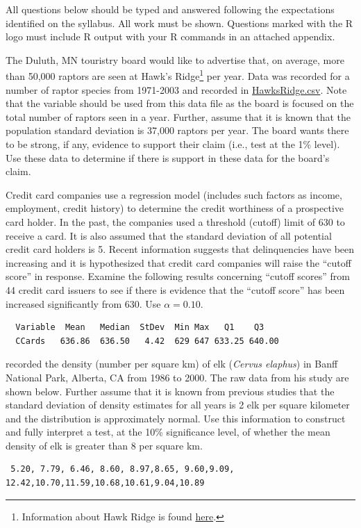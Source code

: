\documentclass[10pt,openany]{book}\usepackage[]{graphicx}\usepackage[]{color}
\begin{document}
\newpage
\begin{hwsection}{All questions below should be typed and answered following the expectations identified on the syllabus.  All work must be shown.  Questions marked with the R logo must include R output with your R commands in an attached appendix.}

  \item \label{hwprob:HypTestZHawks} \rhw{} The Duluth, MN touristry board would like to advertise that, on average, more than 50,000 raptors are seen at Hawk's Ridge\footnote{Information about Hawk Ridge is found \href{http://www.hawkridge.org/}{here}.} per year.  Data was recorded for a number of raptor species from 1971-2003 and recorded in \href{https://raw.githubusercontent.com/droglenc/NCData/master/HawksRidge.csv}{HawksRidge.csv}.  Note that the  variable should be used from this data file as the board is focused on the total number of raptors seen in a year.  Further, assume that it is known that the population standard deviation is 37,000 raptors per year.  The board wants there to be strong, if any, evidence to support their claim (i.e., test at the 1\% level).  Use these data to determine if there is support in these data for the board's claim.

  \item \label{hwprob:HypTestZCredit} Credit card companies use a regression model (includes such factors as income, employment, credit history) to determine the credit worthiness of a prospective card holder. In the past, the companies used a threshold (cutoff) limit of 630 to receive a card.  It is also assumed that the standard deviation of all potential credit card holders is 5.  Recent information suggests that delinquencies have been increasing and it is hypothesized that credit card companies will raise the ``cutoff score'' in response.  Examine the following results concerning ``cutoff scores'' from 44 credit card issuers to see if there is evidence that the ``cutoff score'' has been increased significantly from 630.  Use $\alpha=0.10$.
  \begin{Verbatim}
  Variable  Mean   Median  StDev  Min Max   Q1    Q3
  CCards   636.86  636.50   4.42  629 647 633.25 640.00
  \end{Verbatim}

  \item \label{hwprob:CIelk} \rhw{} \cite{Hebblewhite2000} recorded the density (number per square km) of elk (\textit{Cervus elaphus}) in Banff National Park, Alberta, CA from 1986 to 2000.  The raw data from his study are shown below.  Further assume that it is known from previous studies that the standard deviation of density estimates for all years is 2 elk per square kilometer and the distribution is approximately normal.  Use this information to construct and fully interpret a test, at the 10\% significance level, of whether the mean density of elk is greater than 8 per square km.
  \begin{Verbatim}
 5.20, 7.79, 6.46, 8.60, 8.97,8.65, 9.60,9.09,
12.42,10.70,11.59,10.68,10.61,9.04,10.89
  \end{Verbatim}


\end{hwsection}
\end{document}
